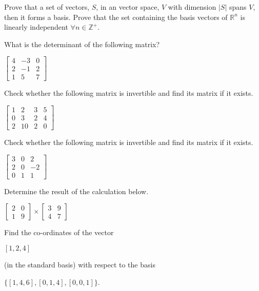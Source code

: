 \documentclass[12pt]{exam}
\begin{document}
\begin{questions}
\question Prove that a set of vectors, $S$, in an vector space, $V$ with dimension $|S|$ spans $V$, then it forms a basis.
\question Prove that the set containing the basis vectors of $\mathbb{R}^{n}$ is linearly independent $\forall n \in \mathbb{Z}^{+}$.

\question What is the determinant of the following matrix?

\begin{center}
$
    \begin{bmatrix}
4&-3&0\\
2&-1&2\\
1&5&7
    \end{bmatrix}
    $
\end{center}

\question Check whether the following matrix is invertible and find its matrix if it exists.

\begin{center}
$
    \begin{bmatrix}
1 & 2 & 3 & 5\\
0 & 3 & 2 & 4\\
2 & 10 & 2 & 0
    \end{bmatrix}
    $
\end{center}

\question Check whether the following matrix is invertible and find its matrix if it exists.

\begin{center}
$
    \begin{bmatrix}
3&0&2\\
2&0&-2\\
0&1&1
    \end{bmatrix}
    $
\end{center}

\question Determine the result of the calculation below.

\begin{center}
$
    \begin{bmatrix}
2&0\\
1&9
    \end{bmatrix}
    \times
        \begin{bmatrix}
3&9\\
4&7
    \end{bmatrix}
    $
\end{center}

\question Find the co-ordinates of the vector
\begin{center} $[1,2,4]$
\end{center} (in the standard basis) with respect to the basis \begin{center} $\{[1,4,6],[0,1,4],[0,0,1]\}$. \end{center}


\end{questions}
\end{document}
